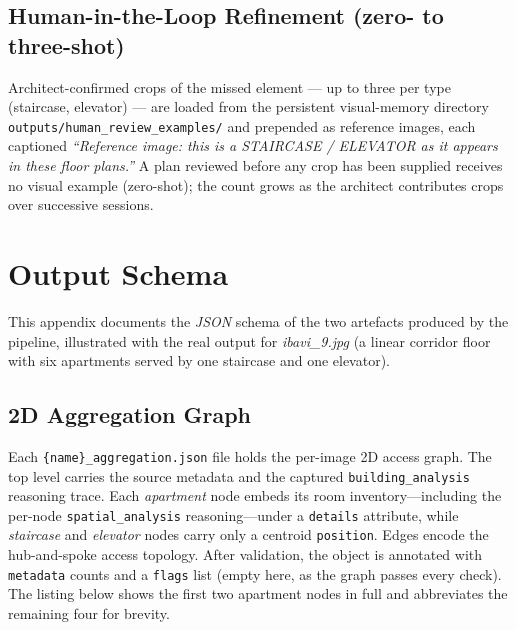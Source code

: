 \documentclass[12pt,a4paper,openright]{report}
\newcommand{\code}[1]{\texttt{#1}}
\begin{document}
\begin{appendices}
\section{Human-in-the-Loop Refinement (zero- to three-shot)}
\label{appendix:ex-review}

Architect-confirmed crops of the missed element --- up to three per type
(staircase, elevator) --- are loaded from the persistent visual-memory
directory \code{outputs/human\_review\_examples/} and prepended as reference
images, each captioned \textit{``Reference image: this is a STAIRCASE / ELEVATOR
as it appears in these floor plans.''} A plan reviewed before any crop has been
supplied receives no visual example (zero-shot); the count grows as the
architect contributes crops over successive sessions.


\chapter{Output Schema}
\label{appendix:json-schema}

This appendix documents the \textit{JSON} schema of the two artefacts produced by the pipeline, illustrated with the real output for \textit{ibavi\_9.jpg} (a linear corridor floor with six apartments served by one staircase and one elevator).

\section{2D Aggregation Graph}
\label{appendix:json-2d}

Each \code{\{name\}\_aggregation.json} file holds the per-image 2D access graph. The top level carries the source metadata and the captured \code{building\_analysis} reasoning trace. Each \emph{apartment} node embeds its room inventory---including
the per-node \code{spatial\_analysis} reasoning---under a \code{details} attribute, while \emph{staircase} and \emph{elevator} nodes carry only a centroid \code{position}. Edges encode the hub-and-spoke access topology. After validation, the object is annotated with \code{metadata} counts and a \code{flags} list (empty here, as the graph passes every check). The listing below shows the first two
apartment nodes in full and abbreviates the remaining four for brevity.


\end{appendices}
\end{document}
